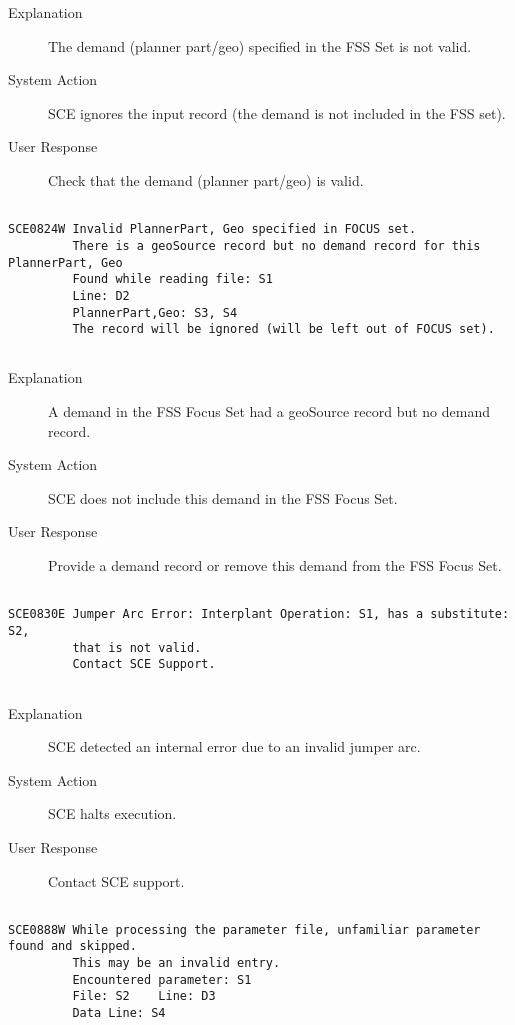 \begin{description}
\item[Explanation]  The demand (planner part/geo) specified in the FSS Set is not valid.

\item[System Action]  SCE ignores the input record (the demand is not included in the FSS set).

\item[User Response]  Check that the demand (planner part/geo) is valid.
\end{description}
\hrulefill
\begin{verbatim}

SCE0824W Invalid PlannerPart, Geo specified in FOCUS set.
         There is a geoSource record but no demand record for this PlannerPart, Geo
         Found while reading file: S1
         Line: D2
         PlannerPart,Geo: S3, S4
         The record will be ignored (will be left out of FOCUS set).
         
\end{verbatim}
\begin{description}
\item[Explanation]  A demand in the FSS Focus Set had a geoSource record but no
 demand record.

\item[System Action]  SCE does not include this demand in the FSS Focus Set.

\item[User Response]  Provide a demand record or remove this demand from the FSS
 Focus Set.
\end{description}
\hrulefill
\begin{verbatim}

SCE0830E Jumper Arc Error: Interplant Operation: S1, has a substitute: S2,
         that is not valid.
         Contact SCE Support.
         
\end{verbatim}
\begin{description}
\item[Explanation]  SCE detected an internal error due to an invalid jumper arc.

\item[System Action]  SCE halts execution.

\item[User Response]  Contact SCE support.
\end{description}
\hrulefill
\begin{verbatim}

SCE0888W While processing the parameter file, unfamiliar parameter found and skipped.
         This may be an invalid entry.
         Encountered parameter: S1
         File: S2    Line: D3
         Data Line: S4
         
\end{verbatim}

